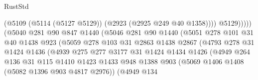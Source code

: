 \begin{lexlean}{RustStd}
\begin{coremodule}
                                            (@5109
                                              (@5114 (@5127 @5129))
                                              (@2923 (@2925 @249 @40 @1358))))
                                          @5129)))))
                                (@5040
                                  @281
                                  @90
                                  @847
                                  @1440
                                  (@5046
                                    @281
                                    @90
                                    @1440
                                    (@5051
                                      @278
                                      @101
                                      @31
                                      @40
                                      @1438
                                      @923
                                      (@5059
                                        @278
                                        @103
                                        @31
                                        @2863
                                        @1438
                                        @2867
                                        (@4793
                                          @278
                                          @31
                                          @1424
                                          @1436
                                          (@4939
                                            @275
                                            @277
                                            @3177
                                            @31
                                            @1424
                                            @1434
                                            @1426
                                            (@4949
                                              @264
                                              @136
                                              @31
                                              @115
                                              @1410
                                              @1423
                                              @1433
                                              @948
                                              @1388
                                              @903
                                              (@5069 @1406 @1408 (@5082 @1396 @903 @4817 @2976))
                                              (@4949
                                                @134

\end{coremodule}
\end{lexlean}
